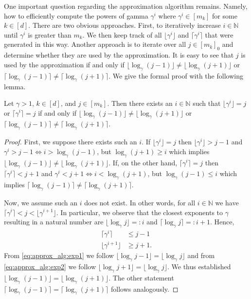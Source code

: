 One important question regarding the approximation algorithm remains. Namely, how to efficiently compute the powers of gamma $\gamma^i$ where $\gamma^i \in [m_k]$ for some $k \in [d]$. There are two obvious approaches. First, to iteratively increase $i \in \mathbb{N}$ until $\gamma^i$ is greater than $m_k$. We then keep track of all $\lfloor\gamma^i\rfloor$ and $\lceil\gamma^i\rceil$ that were generated in this way. Another approach is to iterate over all $j \in [m_k]_0$ and determine whether they are used by the approximation. It is easy to see that $j$ is used by the approximation if and only if $\lfloor\log_{\gamma} (j-1)\rfloor \neq \lfloor\log_{\gamma} (j+1)\rfloor$ or $\lceil\log_{\gamma} (j-1)\rceil \neq \lceil\log_{\gamma} (j+1)\rceil$. We give the formal proof with the following lemma.

\begin{lemma}
Let $\gamma > 1$, $k \in [d]$, and $j \in [m_k]$. Then there exists an $i \in \mathbb{N}$ such that $\lfloor\gamma^i\rfloor = j$ or $\lceil\gamma^i\rceil = j$ if and only if $\lfloor\log_{\gamma} (j-1)\rfloor \neq \lfloor\log_{\gamma} (j+1)\rfloor$ or $\lceil\log_{\gamma} (j-1)\rceil \neq \lceil\log_{\gamma} (j+1)\rceil$.
\end{lemma}
\begin{proof}
First, we suppose there exists such an $i$. If $\lfloor\gamma^i\rfloor = j$ then $\lfloor\gamma^i\rfloor > j-1$ and $\gamma^i > j-1 \iff i > \log_{\gamma} (j-1)$, but $\log_{\gamma} (j+1) \geq i$ which implies $\lfloor\log_{\gamma} (j-1)\rfloor \neq \lfloor\log_{\gamma} (j+1)\rfloor$. If, on the other hand, $\lceil\gamma^i\rceil = j$ then $\lceil\gamma^i\rceil < j+1$ and $\gamma^i < j+1 \iff i < \log_{\gamma} (j+1)$, but $\log_{\gamma} (j-1) \leq i$ which implies $\lceil\log_{\gamma} (j-1)\rceil \neq \lceil\log_{\gamma} (j+1)\rceil$.

Now, we assume such an $i$ does not exist. In other words, for all $i \in \mathbb{N}$ we have $\lceil\gamma^i\rceil < j < \lfloor\gamma^{i+1}\rfloor$. In particular, we observe that the closest exponents to $\gamma$ resulting in a natural number are $\lfloor\log_{\gamma} j \rfloor =: i$ and $\lceil\log_{\gamma} j \rceil =: i+1$. Hence, \begin{align}
    \lceil\gamma^i \rceil       &\leq j-1 \label{eq:approx_alg:exp1} \\
    \lfloor\gamma^{i+1} \rfloor &\geq j+1. \label{eq:approx_alg:exp2}
\end{align} From \autoref{eq:approx_alg:exp1} we follow $\lfloor\log_{\gamma} j-1 \rfloor = \lfloor\log_{\gamma} j \rfloor$ and from \autoref{eq:approx_alg:exp2} we follow $\lfloor\log_{\gamma} j+1 \rfloor = \lfloor\log_{\gamma} j \rfloor$. We thus established $\lfloor\log_{\gamma} (j-1)\rfloor = \lfloor\log_{\gamma} (j+1)\rfloor$. The other statement $\lceil\log_{\gamma} (j-1)\rceil = \lceil\log_{\gamma} (j+1)\rceil$ follows analogously.
\end{proof}

